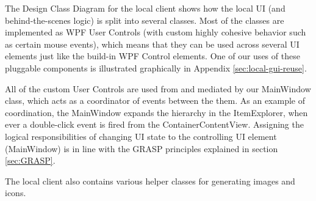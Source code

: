 The Design Class Diagram for the local client shows how the local UI (and behind-the-scenes logic) is split into several classes. Most of the classes are implemented as WPF User Controls (with custom highly cohesive behavior such as certain mouse events), which means that they can be used across several UI elements just like the build-in WPF Control elements. One of our uses of these pluggable components is illustrated graphically in Appendix  \ref{sec:local-gui-reuse}.

All of the custom User Controls are used from and mediated by our MainWindow class, which acts as a coordinator of events between the them. As an example of coordination, the MainWindow expands the hierarchy in the ItemExplorer, when ever a double-click event is fired from the ContainerContentView. Assigning the logical responsibilities of changing UI state to the controlling UI element (MainWindow) is in line with the GRASP principles explained in section \ref{sec:GRASP}.

The local client also contains various helper classes for generating images and icons.